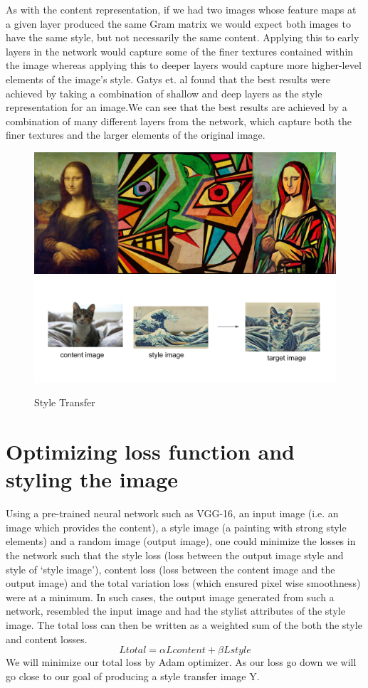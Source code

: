 \begin{styletransfer}
    As with the content representation, if we had two images whose feature maps at a given layer produced the same Gram matrix we would expect both images to have the same style, but not necessarily the same content. Applying this to early layers in the network would capture some of the finer textures contained within the image whereas applying this to deeper layers would capture more higher-level elements of the image’s style. Gatys et. al found that the best results were achieved by taking a combination of shallow and deep layers as the style representation for an image.We can see that the best results are achieved by a combination of many different layers from the network, which capture both the finer textures and the larger elements of the original image.
    \begin{figure}[h]
        \centering
        \includegraphics[width=0.8\linewidth]{styletransfer.png}
         \includegraphics[width=0.8\linewidth]{styletransfercat.png}
        \caption{Style Transfer}
    \end{figure} 

\section{Optimizing loss function and styling the image}
    Using a pre-trained neural network such as VGG-16, an input image (i.e. an image which provides the content), a style image (a painting with strong style elements) and a random image (output image), one could minimize the losses in the network such that the style loss (loss between the output image style and style of ‘style image’), content loss (loss between the content image and the output image) and the total variation loss (which ensured pixel wise smoothness) were at a minimum. In such cases, the output image generated from such a network, resembled the input image and had the stylist attributes of the style image. The total loss can then be written as a weighted sum of the both the style and content losses. 
    \[Ltotal = \alpha Lcontent  + \beta Lstyle \]
    We will minimize our total loss by Adam optimizer. As our loss go down we will go close to our goal of producing a style transfer image Y.

\end{styletransfer}

